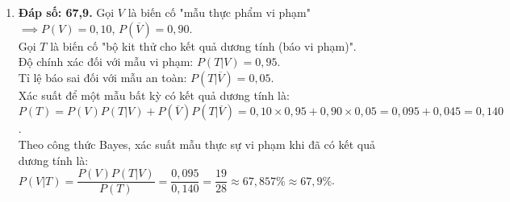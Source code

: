 \documentclass[12pt,a4paper]{article}
\begin{document}
\begin{enumerate}[label=\textbf{Câu \arabic*:}, leftmargin=*]
\item \textbf{Đáp số: 67,9.} Gọi $V$ là biến cố "mẫu thực phẩm vi phạm" $\implies P(V) = 0{,}10$, $P(\overline{V}) = 0{,}90$.\\
Gọi $T$ là biến cố "bộ kit thử cho kết quả dương tính (báo vi phạm)".\\
Độ chính xác đối với mẫu vi phạm: $P(T|V) = 0{,}95$.\\
Tỉ lệ báo sai đối với mẫu an toàn: $P(T|\overline{V}) = 0{,}05$.\\
Xác suất để một mẫu bất kỳ có kết quả dương tính là:\\
$P(T) = P(V)P(T|V) + P(\overline{V})P(T|\overline{V}) = 0{,}10 \times 0{,}95 + 0{,}90 \times 0{,}05 = 0{,}095 + 0{,}045 = 0{,}140$.\\
Theo công thức Bayes, xác suất mẫu thực sự vi phạm khi đã có kết quả dương tính là:\\
$P(V|T) = \dfrac{P(V)P(T|V)}{P(T)} = \dfrac{0{,}095}{0{,}140} = \dfrac{19}{28} \approx 67{,}857\% \approx 67{,}9\%$.
\end{enumerate}
\end{document}
